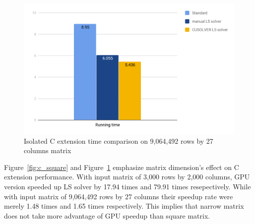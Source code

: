 \documentclass[English]{dicomopapers}
\begin{document}
\begin{figure}[ht]
  \vspace*{-0.5cm}
  \centering
  \includegraphics[width=\columnwidth,natwidth=1200,natheight=742]{c_narrow.png}
  \caption{Isolated C extension time comparison on 9,064,492 rows by 27 columns matrix}\label{fig:c_narrow}
\end{figure}
Figure~\ref{fig:c_square} and Figure~\ref{fig:c_narrow} emphasize matrix dimension's effect on C extension performance. With input matrix of 3,000 rows by 2,000 columns, GPU version speeded up LS solver by 17.94 times and 79.91 times resepectively. While with input matrix of 9,064,492 rows by 27 columns their speedup rate were merely 1.48 times and 1.65 times respectively. This implies that narrow matrix does not take more advantage of GPU speedup than square matrix.
\end{document}
